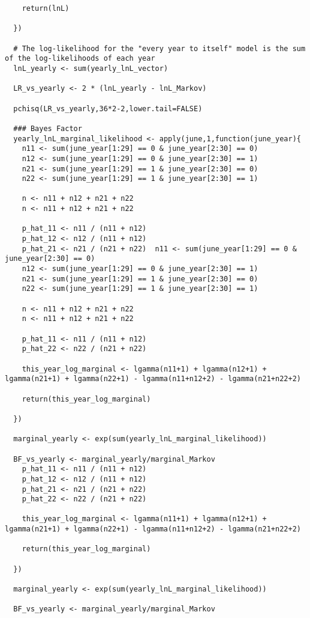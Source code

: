 \documentclass{article} %
\begin{document}
\begin{enumerate}
\begin{enumerate}
\begin{lstlisting}
    return(lnL)

  })

  # The log-likelihood for the "every year to itself" model is the sum of the log-likelihoods of each year
  lnL_yearly <- sum(yearly_lnL_vector)

  LR_vs_yearly <- 2 * (lnL_yearly - lnL_Markov)

  pchisq(LR_vs_yearly,36*2-2,lower.tail=FALSE)

  ### Bayes Factor
  yearly_lnL_marginal_likelihood <- apply(june,1,function(june_year){
    n11 <- sum(june_year[1:29] == 0 & june_year[2:30] == 0)
    n12 <- sum(june_year[1:29] == 0 & june_year[2:30] == 1)
    n21 <- sum(june_year[1:29] == 1 & june_year[2:30] == 0)
    n22 <- sum(june_year[1:29] == 1 & june_year[2:30] == 1)

    n <- n11 + n12 + n21 + n22
    n <- n11 + n12 + n21 + n22

    p_hat_11 <- n11 / (n11 + n12)
    p_hat_12 <- n12 / (n11 + n12)
    p_hat_21 <- n21 / (n21 + n22)  n11 <- sum(june_year[1:29] == 0 & june_year[2:30] == 0)
    n12 <- sum(june_year[1:29] == 0 & june_year[2:30] == 1)
    n21 <- sum(june_year[1:29] == 1 & june_year[2:30] == 0)
    n22 <- sum(june_year[1:29] == 1 & june_year[2:30] == 1)

    n <- n11 + n12 + n21 + n22
    n <- n11 + n12 + n21 + n22

    p_hat_11 <- n11 / (n11 + n12)
    p_hat_22 <- n22 / (n21 + n22)

    this_year_log_marginal <- lgamma(n11+1) + lgamma(n12+1) + lgamma(n21+1) + lgamma(n22+1) - lgamma(n11+n12+2) - lgamma(n21+n22+2)

    return(this_year_log_marginal)

  })

  marginal_yearly <- exp(sum(yearly_lnL_marginal_likelihood))

  BF_vs_yearly <- marginal_yearly/marginal_Markov
    p_hat_11 <- n11 / (n11 + n12)
    p_hat_12 <- n12 / (n11 + n12)
    p_hat_21 <- n21 / (n21 + n22)
    p_hat_22 <- n22 / (n21 + n22)

    this_year_log_marginal <- lgamma(n11+1) + lgamma(n12+1) + lgamma(n21+1) + lgamma(n22+1) - lgamma(n11+n12+2) - lgamma(n21+n22+2)

    return(this_year_log_marginal)

  })

  marginal_yearly <- exp(sum(yearly_lnL_marginal_likelihood))

  BF_vs_yearly <- marginal_yearly/marginal_Markov
\end{lstlisting}


\end{enumerate}
\end{enumerate}
\end{document}
